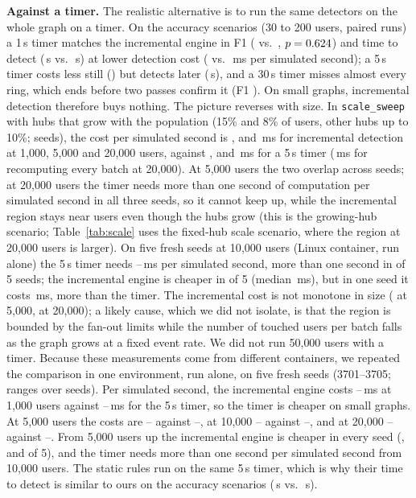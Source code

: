 \textbf{Against a timer.} The realistic alternative is to run the same
detectors on the whole graph on a timer. On the accuracy scenarios (30 to 200
users, \TmRuns{} paired runs) a 1\,s timer matches the incremental engine in F1
(\TmOneF{} vs.\ \TmIncF{}, $p=0.624{}$) and time to detect
(\TmOneTTD{}\,s vs.\ \TmIncTTD{}\,s) at lower detection cost (\TmOneCost{}
vs.\ \TmIncCost{}\,ms per simulated second); a 5\,s timer costs less still
(\TmFiveCost{}) but detects later (\TmFiveTTD{}\,s), and a 30\,s timer misses
almost every ring, which ends before two passes confirm it (F1 \TmThirtyF{}).
On small graphs, incremental detection therefore buys nothing. The picture
reverses with size. In \texttt{scale\_sweep} with hubs that grow with the
population (15\% and 8\% of users, other hubs up to 10\%; \GhSeeds{} seeds), the
cost per simulated second is \GhIncCostA{}, \GhIncCostB{} and \GhIncCostC{}\,ms
for incremental detection at 1{,}000, 5{,}000 and 20{,}000 users, against
\GhTimerCostA{}, \GhTimerCostB{} and \GhTimerCostC{}\,ms for a 5\,s timer
(\GhFullCostC{}\,ms for recomputing every batch at 20{,}000). At 5{,}000 users
the two overlap across seeds; at 20{,}000 users the timer needs more than one
second of computation per simulated second in all three seeds, so it cannot
keep up, while the incremental region stays near \GhIncRegionC{} users even
though the hubs grow (this is the growing-hub scenario; Table~\ref{tab:scale}
uses the fixed-hub scale scenario, where the region at 20{,}000 users is larger). On five fresh seeds at 10{,}000 users (Linux
container, run alone) the 5\,s timer needs \RfScaleTenTimerLo{}--\RfScaleTenTimerHi{}\,ms
per simulated second, more than one second in \RfScaleTenTimerOver{} of 5 seeds;
the incremental engine is cheaper in \RfScaleTenWins{} of 5 (median
\RfScaleTenIncMed{}\,ms), but in one seed it costs \RfScaleTenIncHi{}\,ms, more
than the timer. The incremental
cost is not monotone in size (\GhIncCostB{} at 5{,}000, \GhIncCostC{} at
20{,}000); a likely cause, which we did not isolate, is that the region is
bounded by the fan-out limits while the number of touched users per batch
falls as the graph grows at a fixed event rate. We did not run 50{,}000 users
with a timer. Because these measurements come from different containers, we
repeated the comparison in one environment, run alone, on five fresh seeds
(3701--3705; ranges over seeds). Per simulated second, the incremental engine
costs \RtLatOneIncLo{}--\RtLatOneIncHi{}\,ms at 1{,}000 users against
\RtLatOneTimLo{}--\RtLatOneTimHi{}\,ms for the 5\,s timer, so the timer is cheaper on
small graphs. At 5{,}000 users the costs are \RtLatFiveIncLo{}--\RtLatFiveIncHi{} against
\RtLatFiveTimLo{}--\RtLatFiveTimHi{}, at 10{,}000 \RtLatTenIncLo{}--\RtLatTenIncHi{} against
\RtLatTenTimLo{}--\RtLatTenTimHi{}, and at 20{,}000 \RtLatTwentyIncLo{}--\RtLatTwentyIncHi{}
against \RtLatTwentyTimLo{}--\RtLatTwentyTimHi{}. From 5{,}000 users up the incremental
engine is cheaper in every seed (\RtLatFiveWins{}, \RtLatTenWins{} and
\RtLatTwentyWins{} of 5), and the timer needs more than one second per simulated
second from 10{,}000 users. The static rules run on
the same 5\,s timer, which is why their time to detect is similar to ours on the
accuracy scenarios (\EPropTTD{}\,s vs.\ \ECapTenTTD{}\,s).

